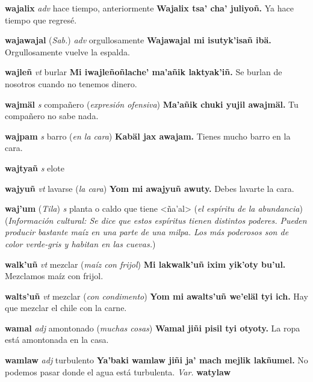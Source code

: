 \documentclass[10pt]{scrbook}
\newcommand{\entry}[1]{\textbf{#1}}
\newcommand{\partofspeech}[1]{\textit{#1}}
\newcommand{\spanishtranslation}[1]{#1}
\newcommand{\clarification}[1]{(\textit{#1})}
\newcommand{\cholexample}[1]{\textbf{#1}}
\newcommand{\exampletranslation}[1]{#1}
\newcommand{\relevantdialect}[1]{(\textit{#1})}
\newcommand{\culturalinformation}[1]{(\textit{#1})}
\newcommand{\variation}[1]{\textit{Var.} \textbf{#1}}
\begin{document}
\begin{multicols}{2}
\entry{wajalix}
\partofspeech{adv}
\spanishtranslation{hace tiempo, anteriormente}
\cholexample{Wajalix tsa' cha' juliyoñ.}
\exampletranslation{Ya hace tiempo que regresé.}

\entry{wajawajal}
\relevantdialect{Sab.}
\partofspeech{adv}
\spanishtranslation{orgullosamente}
\cholexample{Wajawajal mi isutyk'isañ ibä.}
\exampletranslation{Orgullosamente vuelve la espalda.}

\entry{wajleñ}
\partofspeech{vt}
\spanishtranslation{burlar}
\cholexample{Mi iwajleñoñlache' ma'añik laktyak'iñ.}
\exampletranslation{Se burlan de nosotros cuando no tenemos dinero.}

\entry{wajmäl}
\partofspeech{s}
\spanishtranslation{compañero}
\clarification{expresión ofensiva}
\cholexample{Ma'añik chuki yujil awajmäl.}
\exampletranslation{Tu compañero no sabe nada.}

\entry{wajpam}
\partofspeech{s}
\spanishtranslation{barro}
\clarification{en la cara}
\cholexample{Kabäl jax awajam.}
\exampletranslation{Tienes mucho barro en la cara.}

\entry{wajtyañ}
\partofspeech{s}
\spanishtranslation{elote}

\entry{wajyuñ}
\partofspeech{vt}
\spanishtranslation{lavarse}
\clarification{la cara}
\cholexample{Yom mi awajyuñ awuty.}
\exampletranslation{Debes lavarte la cara.}

\entry{waj'um}
\relevantdialect{Tila}
\partofspeech{s}
\spanishtranslation{planta o caldo que tiene <ña'al>}
\clarification{el espíritu de la abundancia}
\culturalinformation{Información cultural: Se dice que estos espíritus tienen distintos poderes. Pueden producir bastante maíz en una parte de una milpa. Los más poderosos son de color verde-gris y habitan en las cuevas.}

\entry{walk'uñ}
\partofspeech{vt}
\spanishtranslation{mezclar}
\clarification{maíz con frijol}
\cholexample{Mi lakwalk'uñ ixim yik'oty bu'ul.}
\exampletranslation{Mezclamos maíz con frijol.}

\entry{walts'uñ}
\partofspeech{vt}
\spanishtranslation{mezclar}
\clarification{con condimento}
\cholexample{Yom mi awalts'uñ we'eläl tyi ich.}
\exampletranslation{Hay que mezclar el chile con la carne.}

\entry{wamal}
\partofspeech{adj}
\spanishtranslation{amontonado}
\clarification{muchas cosas}
\cholexample{Wamal jiñi pisil tyi otyoty.}
\exampletranslation{La ropa está amontonada en la casa.}

\entry{wamlaw}
\partofspeech{adj}
\spanishtranslation{turbulento}
\cholexample{Ya'baki wamlaw jiñi ja' mach mejlik lakñumel.}
\exampletranslation{No podemos pasar donde el agua está turbulenta.}
\variation{watylaw}


\end{multicols}
\end{document}
